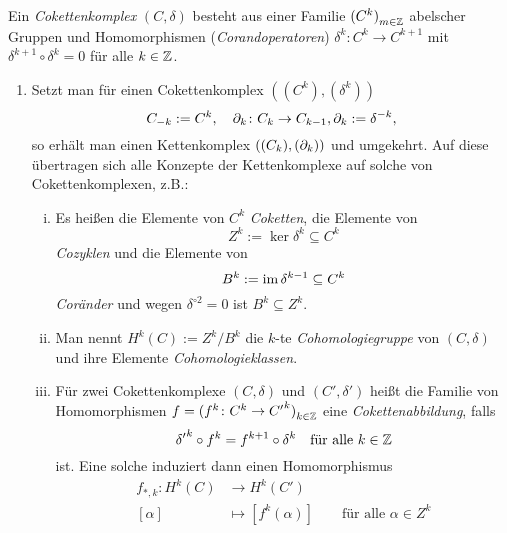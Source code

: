 \begin{defn}
  Ein \emph{Cokettenkomplex} $(C,\delta)$ besteht aus einer Familie ${(C^k)}_{m \in \mathbb{Z}}$ abelscher Gruppen und Homomorphismen (\emph{Corandoperatoren}) $\delta^k\colon C^k \to C^{k+1}$ mit $\delta^{k+1} \circ \delta^k = 0$ für alle $k \in \mathbb{Z}$.
\end{defn}
\begin{kommentar}
  \begin{enumerate}
    \item
      Setzt man für einen Cokettenkomplex $( (C^k), (\delta^k))$
      \begin{equation*}
        C_{-k} := C^k, \quad \partial_k\colon C_k \to C_{k-1}, \partial_k := \delta^{-k},
      \end{equation*}
      so erhält man einen Kettenkomplex $( (C_k), (\partial_k) )$ und umgekehrt.
      Auf diese übertragen sich alle Konzepte der Kettenkomplexe auf solche von Cokettenkomplexen, z.B.:
      \begin{enumerate}[(i)]
        \item
          Es heißen die Elemente von $C^k$ \emph{Coketten}, die Elemente von
          \begin{equation*}
            Z^k := \ker \delta^k \subseteq C^k
          \end{equation*}
          \emph{Cozyklen} und die Elemente von
          \begin{equation*}
            B^k := \operatorname{im} \delta^{k-1} \subseteq C^k
          \end{equation*}
          \emph{Coränder} und wegen $\delta^{\circ 2} = 0$ ist $B^k \subseteq  Z^k$.
        \item
          Man nennt $H^k(C) := Z^k/{B^k}$ die $k$-te \emph{Cohomologiegruppe} von $(C,\delta)$ und ihre Elemente \emph{Cohomologieklassen}.
        \item
          Für zwei Cokettenkomplexe $(C,\delta)$ und $(C',\delta')$ heißt die Familie von Homomorphismen $f = {(f^k\colon C^k \to {C'}^k)}_{k \in \mathbb{Z}}$ eine \emph{Cokettenabbildung}, falls
          \begin{equation*}
            {\delta'}^k \circ f^k = f^{k+1} \circ \delta^k \quad \text{für alle $k \in \mathbb{Z}$}
          \end{equation*}
          ist.
          Eine solche induziert dann einen Homomorphismus
          \begin{align*}
            f_{*,k}\colon H^k(C) & \to H^k(C') \\
            [\alpha] & \mapsto [f^k(\alpha)] \qquad \text{für alle $\alpha \in Z^k$}

\end{align*}
\end{enumerate}
\end{enumerate}
\end{kommentar}
